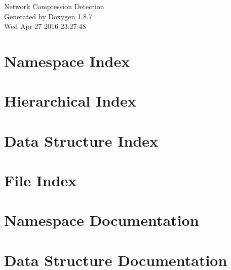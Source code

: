 \documentclass[twoside]{book}
\newcommand{\+}{\discretionary{\mbox{\scriptsize$\hookleftarrow$}}{}{}}
\newcommand{\clearemptydoublepage}{%
  \newpage{\pagestyle{empty}\cleardoublepage}%
}
\begin{document}
\hypersetup{pageanchor=false,
             bookmarks=true,
             bookmarksnumbered=true,
             pdfencoding=unicode
            }
\begin{titlepage}
\vspace*{7cm}
\begin{center}%
{\Large Network Compression Detection }\\
\vspace*{1cm}
{\large Generated by Doxygen 1.8.7}\\
\vspace*{0.5cm}
{\small Wed Apr 27 2016 23:27:48}\\
\end{center}
\end{titlepage}
\clearemptydoublepage
\tableofcontents
\clearemptydoublepage
{}
\hypersetup{pageanchor=true}

\chapter{Namespace Index}

\chapter{Hierarchical Index}

\chapter{Data Structure Index}

\chapter{File Index}

\chapter{Namespace Documentation}

\chapter{Data Structure Documentation}















\end{document}
